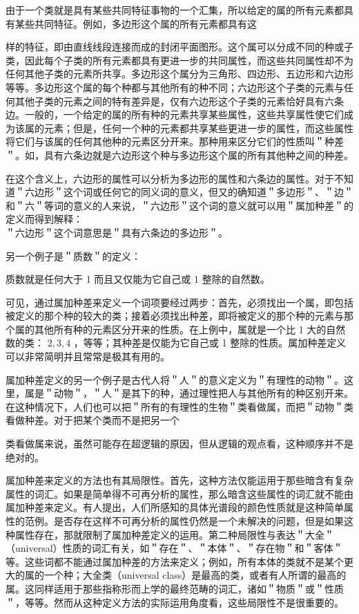 由于一个类就是具有某些共同特征事物的一个汇集，所以给定的属的所有元素都具有某些共同特征。例如，多边形这个属的所有元素都具有这

样的特征，即由直线线段连接而成的封闭平面图形。这个属可以分成不同的种或子类，因此每个子类的所有元素都具有更进一步的共同属性，而这些共同属性却不为任何其他子类的元素所共享。多边形这个属分为三角形、四边形、五边形和六边形等等。多边形这个属的每个种都与其他所有的种不同；六边形这个子类的元素与任何其他子类的元素之间的特有差异是，仅有六边形这个子类的元素恰好具有六条边。一般的，一个给定的属的所有种的元素共享某些属性，这些共享属性使它们成为该属的元素；但是，任何一个种的元素都共享某些更进一步的属性，而这些属性将它们与该属的任何其他种的元素区分开来。那种用来区分它们的性质叫＂种差＂。如，具有六条边就是六边形这个种与多边形这个属的所有其他种之间的种差。

在这个含义上，六边形的属性可以分析为多边形的属性和六条边的属性。对于不知道＂六边形＂这个词或任何它的同义词的意义，但又的确知道＂多边形＂、＂边＂和＂六＂等词的意义的人来说，＂六边形＂这个词的意义就可以用＂属加种差＂的定义而得到解释：\\
＂六边形＂这个词意思是＂具有六条边的多边形＂。

另一个例子是＂质数＂的定义：

质数就是任何大于 1 而且又仅能为它自己或 1 整除的自然数。

可见，通过属加种差来定义一个词项要经过两步：首先，必须找出一个属，即包括被定义的那个种的较大的类；接着必须找出种差，即将被定义的那个种的元素与那个属的其他所有种的元素区分开来的性质。在上例中，属就是一个比 1 大的自然数的类： $2,3,4$ ，等等；其种差是仅能为它自己或 1 整除的性质。属加种差定义可以非常简明并且常常是极其有用的。

属加种差定义的另一个例子是古代人将＂人＂的意义定义为＂有理性的动物＂。这里，属是＂动物＂，＂人＂是其下的种，通过理性把人与其他所有的种区别开来。在这种情况下，人们也可以把＂所有的有理性的生物＂类看做属，而把＂动物＂类看做种差。对于把某个类而不是把另一个

类看做属来说，虽然可能存在超逻辑的原因，但从逻辑的观点看，这种顺序并不是绝对的。

属加种差来定义的方法也有其局限性。首先，这种方法仅能运用于那些暗含有复杂属性的词汇。如果是简单得不可再分析的属性，那么暗含这些属性的词汇就不能由属加种差来定义。有人提出，人们所感知的具体光谱段的颜色性质就是这种简单属性的范例。是否存在这样不可再分析的属性仍然是一个未解决的问题，但是如果这种属性存在，那就限制了属加种差定义的运用。第二种局限性与表达＂大全＂（universal）性质的词汇有关，如＂存在＂、＂本体＂、＂存在物＂和＂客体＂等。这些词都不能通过属加种差的方法来定义；例如，所有本体的类就不是某个更大的属的一个种；大全类（universal class）是最高的类，或者有人所谓的最高的属。这同样适用于那些指称形而上学的最终范畴的词汇，诸如＂物质＂或＂性质＂，等等。然而从这种定义方法的实际运用角度看，这些局限性不是很重要的。

